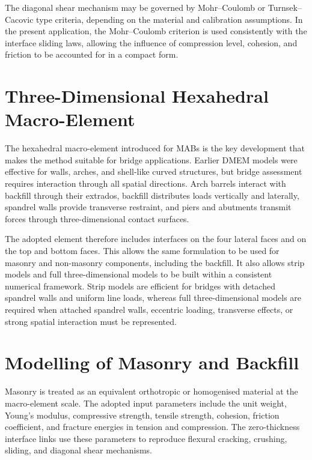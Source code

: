 The diagonal shear mechanism may be governed by Mohr--Coulomb or Turnsek--Cacovic type criteria, depending on the material and calibration assumptions. In the present application, the Mohr--Coulomb criterion is used consistently with the interface sliding laws, allowing the influence of compression level, cohesion, and friction to be accounted for in a compact form.

\section{Three-Dimensional Hexahedral Macro-Element}
\label{sec:dmem-hexahedral}

The hexahedral macro-element introduced for \gls{MAB}s is the key development that makes the method suitable for bridge applications. Earlier \gls{DMEM} models were effective for walls, arches, and shell-like curved structures, but bridge assessment requires interaction through all spatial directions. Arch barrels interact with backfill through their extrados, backfill distributes loads vertically and laterally, spandrel walls provide transverse restraint, and piers and abutments transmit forces through three-dimensional contact surfaces.

The adopted element therefore includes interfaces on the four lateral faces and on the top and bottom faces. This allows the same formulation to be used for masonry and non-masonry components, including the backfill. It also allows strip models and full three-dimensional models to be built within a consistent numerical framework. Strip models are efficient for bridges with detached spandrel walls and uniform line loads, whereas full three-dimensional models are required when attached spandrel walls, eccentric loading, transverse effects, or strong spatial interaction must be represented.

\section{Modelling of Masonry and Backfill}
\label{sec:dmem-materials}

Masonry is treated as an equivalent orthotropic or homogenised material at the macro-element scale. The adopted input parameters include the unit weight, Young's modulus, compressive strength, tensile strength, cohesion, friction coefficient, and fracture energies in tension and compression. The zero-thickness interface links use these parameters to reproduce flexural cracking, crushing, sliding, and diagonal shear mechanisms.

